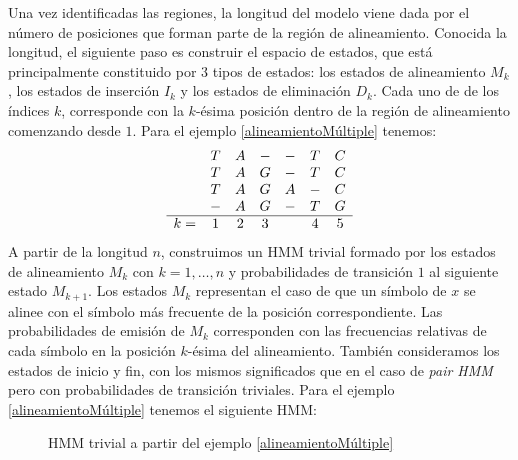 Una vez identificadas las regiones, la longitud del modelo viene dada por el número de posiciones que forman parte de la región de alineamiento. Conocida la longitud, el siguiente paso es construir el espacio de estados, que está principalmente constituido por $3$ tipos de estados: los estados de alineamiento $M_k$, los estados de inserción $I_k$ y los estados de eliminación $D_k$. Cada uno de de los índices $k$, corresponde con la $k$-ésima posición dentro de la región de alineamiento comenzando desde $1$. 
Para el ejemplo \ref{alineamientoMúltiple} tenemos:
\[\begin{array}{c c c c c c c}
   & T & A & - & -  & T & C \\
   & T & A & G & -  & T & C \\
   & T & A & G & A  & - & C \\
   & - & A & G & -  & T & G \\
   \hline
  k= & 1 & 2 & 3 & & 4 & 5 
\end{array}\]   
A partir de la longitud $n$, construimos un HMM trivial formado por los estados de alineamiento $M_k$ con $k=1,\dots, n$ y probabilidades de transición $1$ al siguiente estado $M_{k+1}$. Los estados $M_k$ representan el caso de que un símbolo de $x$ se alinee con el símbolo más frecuente de la posición correspondiente. Las probabilidades de emisión de $M_k$ corresponden con las frecuencias relativas de cada símbolo en la posición $k$-ésima del alineamiento. También consideramos los estados de inicio y fin, con los mismos significados que en el caso de \textit{pair HMM} pero con probabilidades de transición triviales. Para el ejemplo \ref{alineamientoMúltiple} tenemos el siguiente HMM:

\begin{figure}[H]
\centering
{}
\caption{HMM trivial a partir del ejemplo \ref{alineamientoMúltiple}}
\end{figure}

